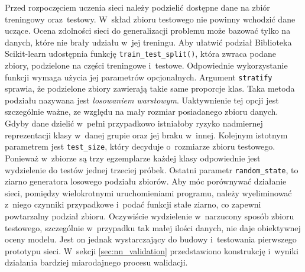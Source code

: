 Przed rozpoczęciem uczenia sieci należy podzielić dostępne dane na zbiór
treningowy oraz~testowy.
W~skład zbioru testowego nie powinny wchodzić dane uczące.
Ocena zdolności sieci do generalizacji problemu może bazować tylko
na danych, które nie brały udziału w~jej treningu.
Aby ułatwić podział Biblioteka Scikit-learn udostępnia funkcję
\texttt{train_test_split()}, która zwraca
podane zbiory, podzielone na części treningowe i~testowe.
Odpowiednie wykorzystanie funkcji wymaga użycia jej parametrów opcjonalnych.
Argument \texttt{stratify} sprawia, że podzielone zbiory
zawierają takie same proporcje klas.
Taka metoda podziału nazywana jest \emph{losowaniem warstowym}.
Uaktywnienie tej opcji jest szczególnie ważne, ze względu na mały rozmiar
posiadanego zbioru danych.
Gdyby dane dzielić w~pełni przypadkowo istniałoby ryzyko nadmiernej
reprezentacji klasy w~danej grupie oraz jej braku w~innej.
Kolejnym istotnym parametrem jest \texttt{test_size}, który
decyduje o~rozmiarze zbioru testowego.
Ponieważ w~zbiorze są trzy egzemplarze każdej klasy odpowiednie jest
wydzielenie do testów jednej trzeciej próbek.
Ostatni parametr \texttt{random_state}, to ziarno generatora
losowego podziału zbiorów.
Aby móc porównywać działanie sieci, pomiędzy wielokrotnymi uruchomieniami
programu, należy wyeliminować z~niego czynniki przypadkowe i~podać
funkcji stałe ziarno, co zapewni powtarzalny podział zbioru.
Oczywiście wydzielenie w~narzucony sposób zbioru testowego, szczególnie
w~przypadku tak małej ilości danych, nie daje obiektywnej oceny modelu.
Jest on jednak wystarczający do budowy i~testowania pierwszego prototypu
sieci.
W~sekcji \ref{sec:nn_validation} przedstawiono konstrukcję i~wyniki działania
bardziej miarodajnego procesu walidacji.


